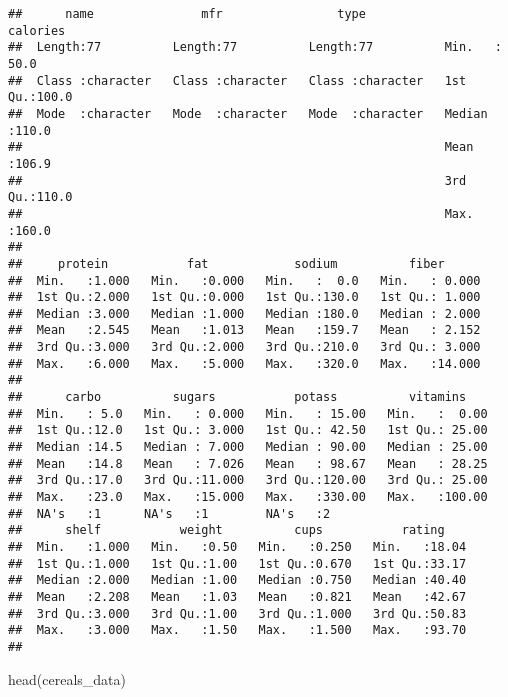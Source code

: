 \documentclass[
]{article}
\newenvironment{Shaded}{\begin{snugshade}}{\end{snugshade}}
\newcommand{\FunctionTok}[1]{\textcolor[rgb]{0.00,0.00,0.00}{#1}}
\newcommand{\NormalTok}[1]{#1}
\begin{document}
\begin{verbatim}
##      name               mfr                type              calories    
##  Length:77          Length:77          Length:77          Min.   : 50.0  
##  Class :character   Class :character   Class :character   1st Qu.:100.0  
##  Mode  :character   Mode  :character   Mode  :character   Median :110.0  
##                                                           Mean   :106.9  
##                                                           3rd Qu.:110.0  
##                                                           Max.   :160.0  
##                                                                          
##     protein           fat            sodium          fiber       
##  Min.   :1.000   Min.   :0.000   Min.   :  0.0   Min.   : 0.000  
##  1st Qu.:2.000   1st Qu.:0.000   1st Qu.:130.0   1st Qu.: 1.000  
##  Median :3.000   Median :1.000   Median :180.0   Median : 2.000  
##  Mean   :2.545   Mean   :1.013   Mean   :159.7   Mean   : 2.152  
##  3rd Qu.:3.000   3rd Qu.:2.000   3rd Qu.:210.0   3rd Qu.: 3.000  
##  Max.   :6.000   Max.   :5.000   Max.   :320.0   Max.   :14.000  
##                                                                  
##      carbo          sugars           potass          vitamins     
##  Min.   : 5.0   Min.   : 0.000   Min.   : 15.00   Min.   :  0.00  
##  1st Qu.:12.0   1st Qu.: 3.000   1st Qu.: 42.50   1st Qu.: 25.00  
##  Median :14.5   Median : 7.000   Median : 90.00   Median : 25.00  
##  Mean   :14.8   Mean   : 7.026   Mean   : 98.67   Mean   : 28.25  
##  3rd Qu.:17.0   3rd Qu.:11.000   3rd Qu.:120.00   3rd Qu.: 25.00  
##  Max.   :23.0   Max.   :15.000   Max.   :330.00   Max.   :100.00  
##  NA's   :1      NA's   :1        NA's   :2                        
##      shelf           weight          cups           rating     
##  Min.   :1.000   Min.   :0.50   Min.   :0.250   Min.   :18.04  
##  1st Qu.:1.000   1st Qu.:1.00   1st Qu.:0.670   1st Qu.:33.17  
##  Median :2.000   Median :1.00   Median :0.750   Median :40.40  
##  Mean   :2.208   Mean   :1.03   Mean   :0.821   Mean   :42.67  
##  3rd Qu.:3.000   3rd Qu.:1.00   3rd Qu.:1.000   3rd Qu.:50.83  
##  Max.   :3.000   Max.   :1.50   Max.   :1.500   Max.   :93.70  
## 
\end{verbatim}

\begin{Shaded}
\begin{Highlighting}[]
\FunctionTok{head}\NormalTok{(cereals\_data)}
\end{Highlighting}
\end{Shaded}
\end{document}
